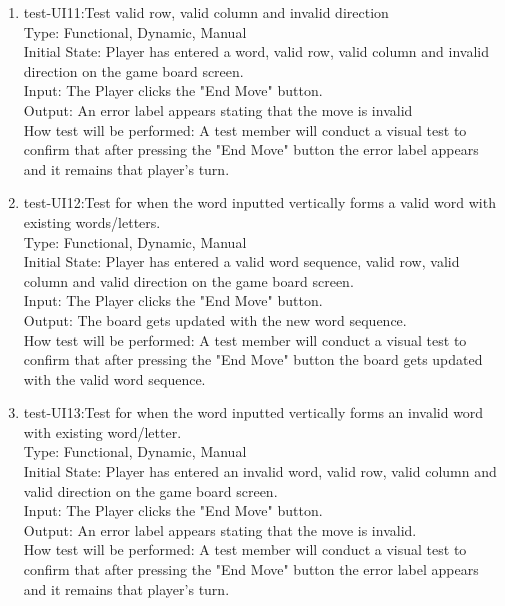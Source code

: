 \documentclass[12pt, titlepage]{article}
\begin{document}
\begin{enumerate}
    \item{test-UI11:Test valid row, valid column and invalid direction\\} %
    Type: Functional, Dynamic, Manual\\
    Initial State: Player has entered a word, valid row, valid column and invalid direction on the game board screen.\\
    Input: The Player clicks the "End Move" button.\\
    Output: An error label appears stating that the move is invalid \\
    How test will be performed: A test member will conduct a visual test to confirm that after pressing the "End Move" button the error label appears and it remains that player's turn.\\
    
    \item{test-UI12:Test for when the word inputted vertically forms a valid word with existing words/letters.\\} %
    Type: Functional, Dynamic, Manual\\
    Initial State: Player has entered a valid word sequence, valid row, valid column and valid direction on the game board screen.\\
    Input: The Player clicks the "End Move" button.\\
    Output: The board gets updated with the new word sequence. \\
    How test will be performed: A test member will conduct a visual test to confirm that after pressing the "End Move" button the board gets updated with the valid word sequence.\\
    
    \item{test-UI13:Test for when the word inputted vertically forms an invalid word with existing word/letter.\\} %
    Type: Functional, Dynamic, Manual\\
    Initial State: Player has entered an invalid word, valid row, valid column and valid direction on the game board screen.\\
    Input: The Player clicks the "End Move" button.\\
    Output: An error label appears stating that the move is invalid.\\
    How test will be performed: A test member will conduct a visual test to confirm that after pressing the "End Move" button the error label appears and it remains that player's turn.\\
    

\end{enumerate}
\end{document}
